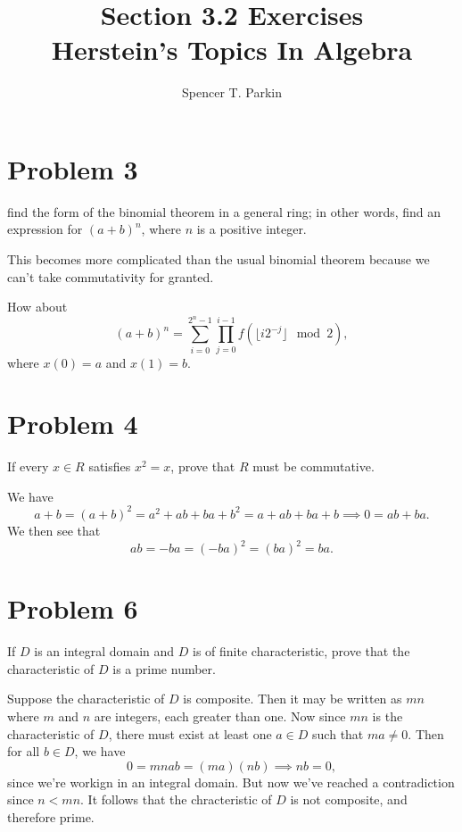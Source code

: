 \documentclass[12pt]{article}
\title{Section 3.2 Exercises\\Herstein's Topics In Algebra}
\author{Spencer T. Parkin}
\begin{document}
\maketitle

\section*{Problem 3}

find the form of the binomial theorem in a general ring; in other words,
find an expression for $(a+b)^n$, where $n$ is a positive integer.

This becomes more complicated than the usual binomial theorem because
we can't take commutativity for granted.

How about
\begin{equation*}
(a+b)^n=\sum_{i=0}^{2^n-1}\prod_{j=0}^{i-1} f(\lfloor i2^{-j}\rfloor\mod 2),
\end{equation*}
where $x(0)=a$ and $x(1)=b$.

\section*{Problem 4}

If every $x\in R$ satisfies $x^2=x$, prove that $R$ must be commutative.

We have
\begin{equation*}
a+b=(a+b)^2=a^2+ab+ba+b^2=a+ab+ba+b\implies 0=ab+ba.
\end{equation*}
We then see that
\begin{equation*}
ab=-ba=(-ba)^2=(ba)^2=ba.
\end{equation*}

\section*{Problem 6}

If $D$ is an integral domain and $D$ is of finite characteristic, prove that
the characteristic of $D$ is a prime number.

Suppose the characteristic of $D$ is composite.  Then it may be written
as $mn$ where $m$ and $n$ are integers, each greater than one.
Now since $mn$ is the characteristic of $D$, there must exist at least one $a\in D$
such that $ma\neq 0$.  Then for all $b\in D$, we have
\begin{equation*}
0 = mnab = (ma)(nb)\implies nb = 0,
\end{equation*}
since we're workign in an integral domain.  But now we've reached a contradiction
since $n<mn$.  It follows that the chracteristic of $D$ is not composite, and therefore prime.
\end{document}
